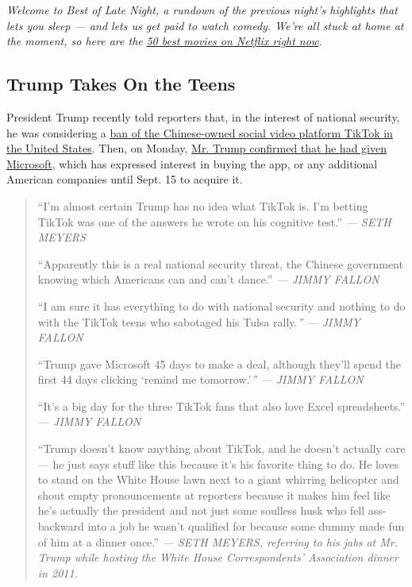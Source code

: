 \emph{Welcome to Best of Late Night, a rundown of the previous night's
highlights that lets you sleep --- and lets us get paid to watch comedy.
We're all stuck at home at the moment, so here are the}
\href{https://www.nytimes.com/interactive/2020/arts/television/best-movies-on-netflix.html}{\emph{50
best movies on Netflix right now}}\emph{.}

\hypertarget{trump-takes-on-the-teens}{%
\subsection{Trump Takes On the Teens}\label{trump-takes-on-the-teens}}

President Trump recently told reporters that, in the interest of
national security, he was considering a
\href{https://www.nytimes.com/2020/08/02/style/tiktok-ban-threat-trump.html}{ban
of the Chinese-owned social video platform TikTok in the United States}.
Then, on Monday,
\href{https://www.nytimes.com/2020/08/03/technology/trump-tiktok-microsoft.html}{Mr.
Trump confirmed that he had given Microsoft}, which has expressed
interest in buying the app, or any additional American companies until
Sept. 15 to acquire it.

\begin{quote}
``I'm almost certain Trump has no idea what TikTok is. I'm betting
TikTok was one of the answers he wrote on his cognitive test.''
\emph{--- SETH MEYERS}

``Apparently this is a real national security threat, the Chinese
government knowing which Americans can and can't dance.'' \emph{---
JIMMY FALLON}

``I am sure it has everything to do with national security and nothing
to do with the TikTok teens who sabotaged his Tulsa rally.\emph{'' ---
JIMMY FALLON}

``Trump gave Microsoft 45 days to make a deal, although they'll spend
the first 44 days clicking `remind me tomorrow.'\emph{'' --- JIMMY
FALLON}

``It's a big day for the three TikTok fans that also love Excel
spreadsheets.'' \emph{--- JIMMY FALLON}

``Trump doesn't know anything about TikTok, and he doesn't actually care
--- he just says stuff like this because it's his favorite thing to do.
He loves to stand on the White House lawn next to a giant whirring
helicopter and shout empty pronouncements at reporters because it makes
him feel like he's actually the president and not just some soulless
husk who fell ass-backward into a job he wasn't qualified for because
some dummy made fun of him at a dinner once.'' \emph{--- SETH MEYERS,
referring to his jabs at Mr. Trump while hosting the White House
Correspondents' Association dinner in 2011.}
\end{quote}

